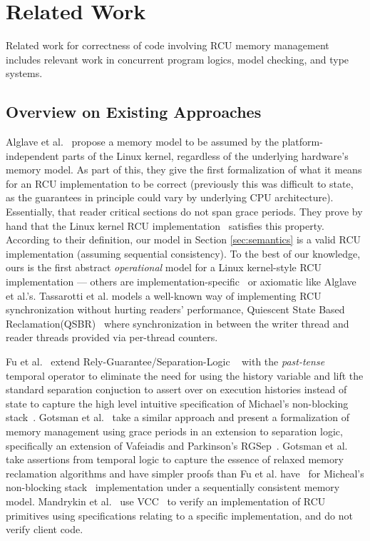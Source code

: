 \section{Related Work}
\label{sec:relatedwork}
Related work for correctness of code involving RCU memory management includes relevant work in concurrent program logics, model checking, and type systems.
\subsection{Overview on Existing Approaches}
Alglave et al.~\cite{Alglave:2018:FSC:3173162.3177156} propose a memory model to be assumed by the platform-independent parts of the Linux kernel, regardless of the underlying hardware's memory model.
As part of this, they give the first formalization of what it means for an RCU implementation to be correct (previously this was difficult to state, as the guarantees in principle could vary by underlying CPU architecture). Essentially, that reader critical sections do not span grace periods.  They prove by hand that the Linux kernel RCU implementation~\cite{DBLP:conf/cav/AlglaveKT13,abssem} satisfies this property. 
According to their definition, our model in Section \ref{sec:semantics} is a valid RCU implementation (assuming sequential consistency).
To the best of our knowledge, ours is the first abstract \emph{operational} model for a Linux kernel-style RCU implementation --- others are implementation-specific~\cite{Mandrykin:2016:TDV:3001219.3001297} or axiomatic like Alglave et al.'s. Tassarotti et al. models a well-known way of implementing RCU synchronization without hurting readers' performance, \textsf{Quiescent State Based Reclamation}(QSBR)~\cite{urcu_ieee} where synchronization in between the writer thread and reader threads provided via per-thread counters. 

 Fu et al.~\cite{shao_temp} extend Rely-Guarantee/Separation-Logic ~\cite{vafeiadis07,Feng:2007:RCS:1762174.1762193,Feng:2009:LRR:1480881.1480922} with the \textit{past-tense} temporal operator to eliminate the need for using the history variable and lift the standard separation conjuction to assert over on execution histories instead of state to capture the high level intuitive specification of Michael's non-blocking stack~\cite{Michael:2004:HPS:987524.987595}. Gotsman et al.~\cite{Gotsman:2013:VCM:2450268.2450289} take a similar approach and present a formalization of memory management using grace periods in an extension to separation logic, specifically an extension of Vafeiadis and Parkinson's \textsf{RGSep}~\cite{vafeiadis07}. Gotsman et al. take assertions from temporal logic to capture the essence of relaxed memory reclamation algorithms and have simpler proofs than Fu et al. have~\cite{shao_temp} for Micheal's non-blocking stack~\cite{Michael:2004:HPS:987524.987595} implementation under a sequentially consistent memory model. Mandrykin et al.~\cite{Mandrykin:2016:TDV:3001219.3001297} use \textsf{VCC}~\cite{Cohen:2009:VPS:1616077.1616080} to verify an implementation of RCU primitives using specifications relating to a specific implementation, and do not verify client code.

